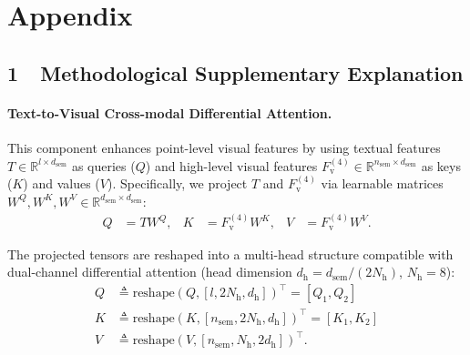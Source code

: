 \documentclass[letterpaper]{article} %
\begin{document}






















\clearpage
\appendix
\section{Appendix}


\subsection{1~~Methodological Supplementary Explanation}

\paragraph{Text-to-Visual Cross-modal Differential Attention.} 
This component enhances point-level visual features by using textual features $T \in \mathbb{R}^{l \times d_\mathrm{sem}}$ as queries ($Q$) and high-level visual features $F_\mathrm{v}^{(4)} \in \mathbb{R}^{n_\mathrm{sem} \times d_\mathrm{sem}}$ as keys ($K$) and values ($V$). Specifically, we project $T$ and $F_\mathrm{v}^{(4)}$ via learnable matrices $W^Q, W^K, W^V \in \mathbb{R}^{d_\mathrm{sem} \times d_\mathrm{sem}}$:
\begin{equation}
	\begin{aligned}
		Q &= T W^Q, & 
		K &= F_\mathrm{v}^{(4)} W^K, & 
		V &= F_\mathrm{v}^{(4)} W^V.
	\end{aligned}
	\label{eq:projection2}
\end{equation}

The projected tensors are reshaped into a multi-head structure compatible with dual-channel differential attention (head dimension $d_\mathrm{h} = d_\mathrm{sem}/(2N_\mathrm{h})$, $N_\mathrm{h} = 8$):
\begin{equation}
	\begin{aligned}
		Q &\triangleq \text{reshape}\left(Q, [l, 2N_\mathrm{h}, d_\mathrm{h}]\right)^\intercal = [Q_1, Q_2] \\
		K &\triangleq \text{reshape}\left(K, [n_\mathrm{sem}, 2N_\mathrm{h}, d_\mathrm{h}]\right)^\intercal = [K_1, K_2] \\
		V &\triangleq \text{reshape}\left(V, [n_\mathrm{sem}, N_\mathrm{h}, 2d_\mathrm{h}]\right)^\intercal.
	\end{aligned}
	\label{eq:q_k_v2}
\end{equation}
\end{document}
